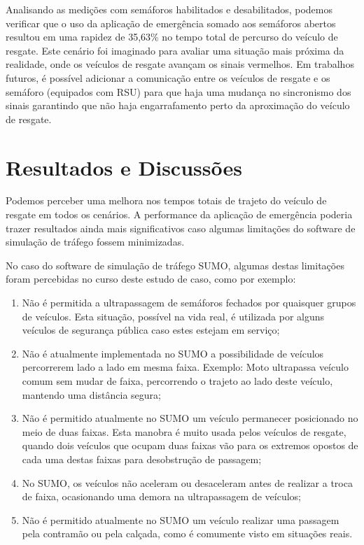 \documentclass[
12pt,				%
openright,			%
oneside,			%
a4paper,			%
brazil,				%
]{abntex2}
\begin{document}
	\par Analisando as medições com semáforos habilitados e desabilitados, podemos verificar que o uso da aplicação de emergência somado aos semáforos abertos resultou em uma rapidez de 35,63\% no tempo total de percurso do veículo de resgate. Este cenário foi imaginado para avaliar uma situação mais próxima da realidade, onde os veículos de resgate avançam os sinais vermelhos. Em trabalhos futuros, é possível adicionar a comunicação entre os veículos de resgate e os semáforo (equipados com RSU) para que haja uma mudança no sincronismo dos sinais garantindo que não haja engarrafamento perto da aproximação do veículo de resgate.


	\section{Resultados e Discussões}

	\par Podemos perceber uma melhora nos tempos totais de trajeto do veículo de resgate em todos os cenários. A performance da aplicação de emergência poderia trazer resultados ainda mais significativos caso algumas limitações do software de simulação de tráfego fossem minimizadas.
	
	\par No caso do software de simulação de tráfego SUMO, algumas destas limitações foram percebidas no curso deste estudo de caso, como por exemplo:
	
	\begin{enumerate}
		\item Não é permitida a ultrapassagem de semáforos fechados por quaisquer grupos de veículos. Esta situação, possível na vida real, é utilizada por alguns veículos de segurança pública caso estes estejam em serviço;
		\item Não é atualmente implementada no SUMO a possibilidade de veículos percorrerem lado a lado em mesma faixa. Exemplo: Moto ultrapassa veículo comum sem mudar de faixa, percorrendo o trajeto ao lado deste veículo, mantendo uma distância segura;
		\item Não é permitido atualmente no SUMO um veículo permanecer posicionado no meio de duas faixas. Esta manobra é muito usada pelos veículos de resgate, quando dois veículos que ocupam duas faixas vão para os extremos opostos de cada uma destas faixas para desobstrução de passagem;
		\item No SUMO, os veículos não aceleram ou desaceleram antes de realizar a troca de faixa, ocasionando uma demora na ultrapassagem de veículos;
		\item Não é permitido atualmente no SUMO um veículo realizar uma passagem pela contramão ou pela calçada, como é comumente visto em situações reais. 
	\end{enumerate}
	
\end{document}
